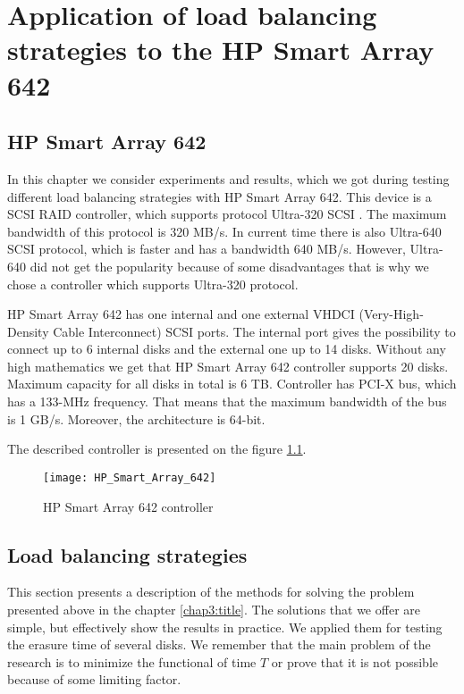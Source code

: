 \chapter{Application of load balancing strategies to the HP Smart Array 642}
\label{chap4:title}


\section{HP Smart Array 642}
In this chapter we consider experiments and results, which we got during testing different load balancing strategies with HP Smart Array 642. This device is a SCSI RAID controller, which supports protocol Ultra-320 SCSI \cite{hp_642_desc}. The maximum bandwidth of this protocol is 320 MB/s. In current time there is also Ultra-640 SCSI protocol, which is faster and has a bandwidth 640 MB/s. However, Ultra-640 did not get the popularity because of some disadvantages that is why we chose a controller which supports Ultra-320 protocol. 

HP Smart Array 642 has one internal and one external VHDCI (Very-High-Density Cable Interconnect) SCSI ports. The internal port gives the possibility to connect up to 6 internal disks and the external one up to 14 disks. Without any high mathematics we get that HP Smart Array 642 controller supports 20 disks. Maximum capacity for all disks in total is 6 TB. Controller has PCI-X bus, which has a 133-MHz frequency. That means that the maximum bandwidth of the bus is 1 GB/s. Moreover, the architecture is 64-bit.

The described controller is presented on the figure \ref{fig:HP_Smart_Array_642}.
\begin{figure}[h]
\begin{center}
  \texttt{[image: HP\_Smart\_Array\_642]}
\end{center}
  \caption{HP Smart Array 642 controller}
  \label{fig:HP_Smart_Array_642}
\end{figure}


\section{Load balancing strategies}
This section presents a description of the methods for solving the problem presented above in the chapter \ref{chap3:title}. The solutions that we offer are simple, but effectively show the results in practice. We applied them for testing the erasure time of several disks. We remember that the main problem of the research is to minimize the functional of time $T$ or prove that it is not possible because of some limiting factor.

